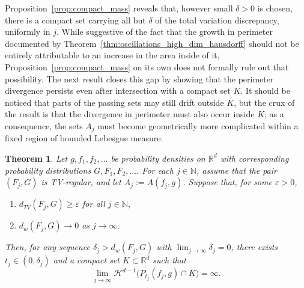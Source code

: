 \documentclass[12pt]{article}
\newtheorem{theorem}{Theorem}
\newcommand{\RR}{\mathbb{R}}
\newcommand{\NN}{\mathbb{N}}
\begin{document}
Proposition~\ref{prop:compact_mass} reveals that, however small $\delta > 0$ is chosen, there is a
compact set carrying all but $\delta$ of the total variation discrepancy, uniformly in $j$. While suggestive of the fact that the growth in perimeter documented by Theorem~\ref{thm:oscillations_high_dim_hausdorff} should not be entirely attributable to an increase in the area inside of it, Proposition~\ref{prop:compact_mass} on its own does not formally rule out that possibility. The next result closes this gap by showing that the
perimeter divergence persists even after intersection with a compact set $K$. It should be noticed that parts of the passing sets may still drift outside $K$, but the crux of the result is that the
divergence in perimeter must also occur inside $K$; as a consequence, the sets $A_j$ must become geometrically more
complicated within a fixed region of bounded Lebesgue measure.

\begin{theorem}\label{thm:oscillations_high_dim_hausdorff_localized}
Let $g, f_1, f_2, \dots$ be probability densities on $\RR^d$ with corresponding probability
distributions $G, F_1, F_2, \dots$. For each $j \in \NN$, assume that the pair $(F_j, G)$ is
TV-regular, and let $A_j := A(f_j,g)$. Suppose that, for some $\varepsilon>0$,
\begin{enumerate}
    \item[(i)] $d_{TV}(F_j, G) \geq \varepsilon$ for all $j \in \NN$,
    \item[(ii)] $d_w(F_j, G) \to 0$ as $j \to \infty$.
\end{enumerate}
Then, for any sequence $\delta_j > d_w(F_j, G)$ with $\lim_{j \to \infty} \delta_j = 0$, there
exists $t_j \in (0, \delta_j)$ and a compact set $K\subset \RR^d$ such that
\begin{equation*}
\lim_{j \to \infty} \mathcal{H}^{d-1}\bigl(P_{t_j}(f_j,g) \cap K\bigr) = \infty.
\end{equation*}
\end{theorem}
\end{document}
